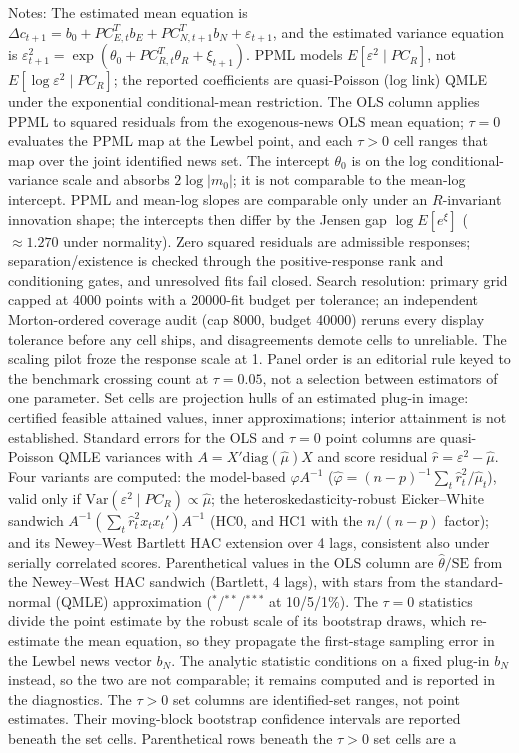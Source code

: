 \begin{table}[!htbp]
\begin{threeparttable}
\begin{tablenotes}[flushleft]
\item Notes: The estimated mean equation is $\Delta c_{t+1}=b_{0}+PC_{E,t}^{T}b_{E}+ PC_{N,t+1}^{T}b_{N}+\varepsilon_{t+1}$, and the estimated variance equation is $\varepsilon_{t+1}^{2}= \exp(\theta_{0}+PC_{R,t}^{T}\theta_{R}+\xi_{t+1})$. PPML models $E[\varepsilon^2 \mid PC_R]$, not $E[\log \varepsilon^2 \mid PC_R]$; the reported coefficients are quasi-Poisson (log link) QMLE under the exponential conditional-mean restriction. The OLS column applies PPML to squared residuals from the exogenous-news OLS mean equation; $\tau{=}0$ evaluates the PPML map at the Lewbel point, and each $\tau{>}0$ cell ranges that map over the joint identified news set. The intercept $\theta_0$ is on the log conditional-variance scale and absorbs $2\log|m_0|$; it is not comparable to the mean-log intercept. PPML and mean-log slopes are comparable only under an $R$-invariant innovation shape; the intercepts then differ by the Jensen gap $\log E[e^{\xi}]$ ($\approx 1.270$ under normality). Zero squared residuals are admissible responses; separation/existence is checked through the positive-response rank and conditioning gates, and unresolved fits fail closed. Search resolution: primary grid capped at 4000 points with a 20000-fit budget per tolerance; an independent Morton-ordered coverage audit (cap 8000, budget 40000) reruns every display tolerance before any cell ships, and disagreements demote cells to unreliable. The scaling pilot froze the response scale at 1. Panel order is an editorial rule keyed to the benchmark crossing count at $\tau{=}0.05$, not a selection between estimators of one parameter. Set cells are projection hulls of an estimated plug-in image: certified feasible attained values, inner approximations; interior attainment is not established. Standard errors for the OLS and $\tau{=}0$ point columns are quasi-Poisson QMLE variances with $A = X'\mathrm{diag}(\hat\mu)X$ and score residual $\hat r = \varepsilon^2 - \hat\mu$. Four variants are computed: the model-based $\hat\varphi A^{-1}$ ($\hat\varphi = (n{-}p)^{-1}\sum_t \hat r_t^2/\hat\mu_t$), valid only if $\mathrm{Var}(\varepsilon^2 \mid PC_R) \propto \hat\mu$; the heteroskedasticity-robust Eicker--White sandwich $A^{-1}(\sum_t \hat r_t^2 x_t x_t')A^{-1}$ (HC0, and HC1 with the $n/(n{-}p)$ factor); and its Newey--West Bartlett HAC extension over 4 lags, consistent also under serially correlated scores. Parenthetical values in the OLS column are $\hat\theta/\mathrm{SE}$ from the Newey--West HAC sandwich (Bartlett, 4 lags), with stars from the standard-normal (QMLE) approximation ($^{*}$/$^{**}$/$^{***}$ at 10/5/1\%). The $\tau{=}0$ statistics divide the point estimate by the robust scale of its bootstrap draws, which re-estimate the mean equation, so they propagate the first-stage sampling error in the Lewbel news vector $b_N$. The analytic statistic conditions on a fixed plug-in $b_N$ instead, so the two are not comparable; it remains computed and is reported in the diagnostics. The $\tau{>}0$ set columns are identified-set ranges, not point estimates. Their moving-block bootstrap confidence intervals are reported beneath the set cells. Parenthetical rows beneath the $\tau{>}0$ set cells are a 
\end{tablenotes}
\end{threeparttable}
\end{table}
